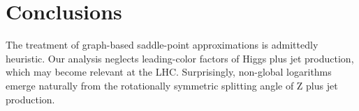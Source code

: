 \section{Conclusions}\label{sec:conclusions}

The treatment of graph-based saddle-point approximations is admittedly
heuristic. Our analysis neglects leading-color factors of Higgs plus jet
production, which may become relevant at the LHC. Surprisingly,
non-global logarithms emerge naturally from the rotationally symmetric
splitting angle of Z plus jet production.

